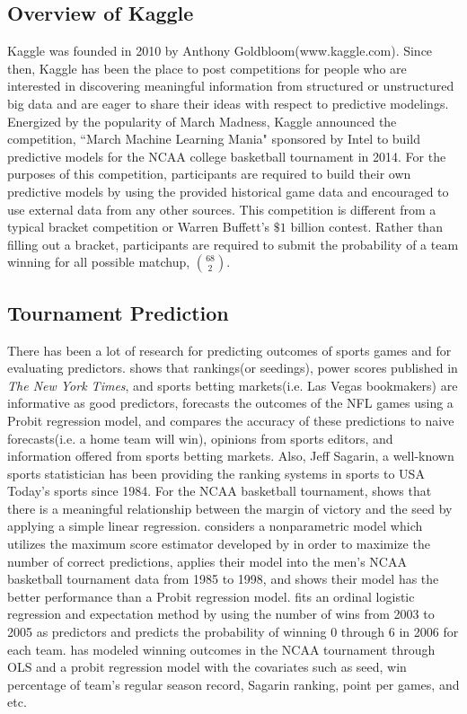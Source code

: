 \subsection{Overview of Kaggle}
Kaggle was founded in 2010 by Anthony Goldbloom(www.kaggle.com). Since then, Kaggle has been the place to post competitions for people who are interested in discovering meaningful information from structured or unstructured big data and are eager to share their ideas with respect to predictive modelings. Energized by the popularity of March Madness, Kaggle announced the competition, ``March Machine Learning Mania" sponsored by Intel to build predictive models for the NCAA college basketball tournament in 2014. For the purposes of this competition, participants are required to build their own predictive models by using the provided historical game data and encouraged to use external data from any other sources. This competition is different from a typical bracket competition or Warren Buffett's $\$ 1$ billion contest. Rather than filling out a bracket, participants are required to submit the probability of a team winning for all possible matchup, $68 \choose 2$.

\subsection{Tournament Prediction}
There has been a lot of research for predicting outcomes of sports games and for evaluating predictors. \cite{boulier2003predicting} shows that rankings(or seedings), power scores published in \emph{The New York Times}, and sports betting markets(i.e. Las Vegas bookmakers) are informative as good predictors, forecasts the outcomes of the NFL games using a Probit regression model, and compares the accuracy of these predictions to naive forecasts(i.e. a home team will win), opinions from sports editors, and information offered from sports betting markets. Also, Jeff Sagarin, a well-known sports statistician has been providing the ranking systems in sports to USA Today's sports since 1984. For the NCAA basketball tournament, \cite{smith1999can} shows that there is a meaningful relationship between the margin of victory and the seed by applying a simple linear regression. \cite{caudill2003predicting} considers a nonparametric model which utilizes the maximum score estimator developed by \cite{manski1977estimation} in order to maximize the number of correct predictions, applies their model into the men's NCAA basketball tournament data from 1985 to 1998, and shows their model has the better performance than a Probit regression model. \cite{west2006simple} fits an ordinal logistic regression and expectation method by using the number of wins from 2003 to 2005 as predictors and predicts the probability of winning 0 through 6 in 2006 for each team. \cite{wright2012statistical} has modeled winning outcomes in the NCAA tournament through OLS and a probit regression model with the covariates such as seed, win percentage of team's regular season record, Sagarin ranking, point per games, and etc.


